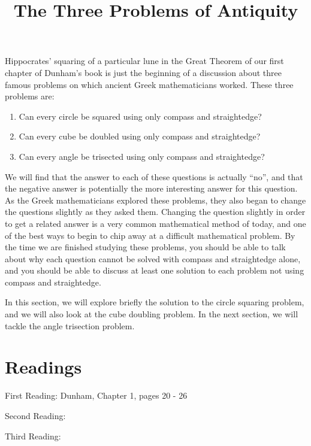 \documentclass{ximera}
\title{The Three Problems of Antiquity}
\begin{document}
\begin{abstract}
\end{abstract}
\maketitle

Hippocrates' squaring of a particular lune in the Great Theorem of our first chapter of Dunham's book is just the beginning of a discussion about three famous problems on which ancient Greek mathematicians worked.  These three problems are:
\begin{enumerate}
	\item Can every circle be squared using only compass and straightedge?
	\item Can every cube be doubled using only compass and straightedge?
	\item Can every angle be trisected using only compass and straightedge?
\end{enumerate}
We will find that the answer to each of these questions is actually ``no'', and that the negative answer is potentially the more interesting answer for this question.  As the Greek mathematicians explored these problems, they also began to change the questions slightly as they asked them.  Changing the question slightly in order to get a related answer is a very common mathematical method of today, and one of the best ways to begin to chip away at a difficult mathematical problem.  By the time we are finished studying these problems, you should be able to talk about why each question cannot be solved with compass and straightedge alone, and you should be able to discuss at least one solution to each problem not using compass and straightedge.

In this section, we will explore briefly the solution to the circle squaring problem, and we will also look at the cube doubling problem.  In the next section, we will tackle the angle trisection problem.



\section{Readings}

First Reading: Dunham, Chapter 1, pages 20 - 26

Second Reading: 

Third Reading: 
\end{document}
